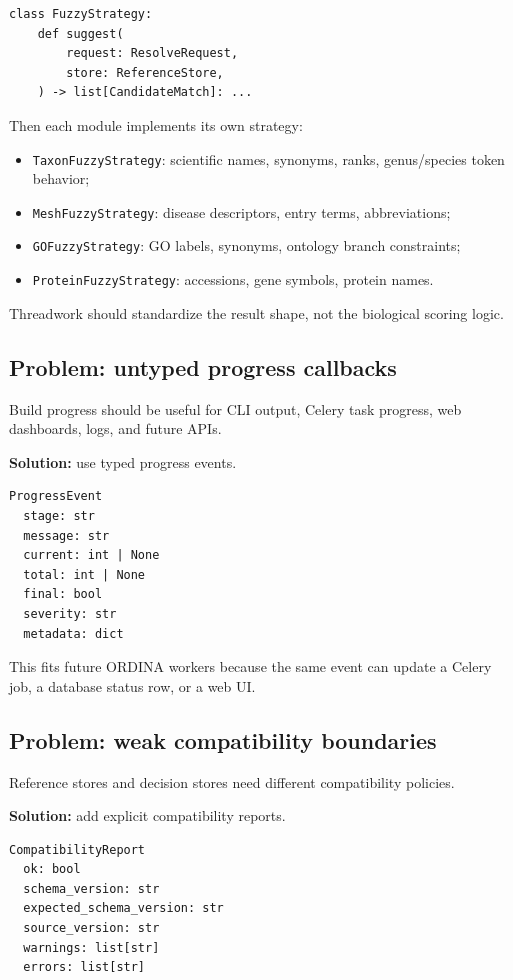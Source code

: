 \documentclass[11pt,a4paper]{article}
\newcommand{\code}[1]{\texttt{#1}}
\begin{document}
\begin{Verbatim}[fontsize=\small]
class FuzzyStrategy:
    def suggest(
        request: ResolveRequest,
        store: ReferenceStore,
    ) -> list[CandidateMatch]: ...
\end{Verbatim}

Then each module implements its own strategy:

\begin{itemize}
  \item \code{TaxonFuzzyStrategy}: scientific names, synonyms, ranks, genus/species token behavior;
  \item \code{MeshFuzzyStrategy}: disease descriptors, entry terms, abbreviations;
  \item \code{GOFuzzyStrategy}: GO labels, synonyms, ontology branch constraints;
  \item \code{ProteinFuzzyStrategy}: accessions, gene symbols, protein names.
\end{itemize}

Threadwork should standardize the result shape, not the biological scoring logic.

\subsection{Problem: untyped progress callbacks}

Build progress should be useful for CLI output, Celery task progress, web dashboards, logs, and future APIs.

\textbf{Solution:} use typed progress events.

\begin{Verbatim}[fontsize=\small]
ProgressEvent
  stage: str
  message: str
  current: int | None
  total: int | None
  final: bool
  severity: str
  metadata: dict
\end{Verbatim}

This fits future ORDINA workers because the same event can update a Celery job, a database status row, or a web UI.

\subsection{Problem: weak compatibility boundaries}

Reference stores and decision stores need different compatibility policies.

\textbf{Solution:} add explicit compatibility reports.

\begin{Verbatim}[fontsize=\small]
CompatibilityReport
  ok: bool
  schema_version: str
  expected_schema_version: str
  source_version: str
  warnings: list[str]
  errors: list[str]
\end{Verbatim}
\end{document}
